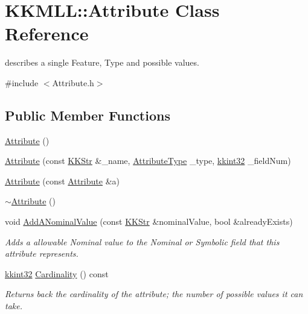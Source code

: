 \hypertarget{class_k_k_m_l_l_1_1_attribute}{}\section{K\+K\+M\+LL\+:\+:Attribute Class Reference}
\label{class_k_k_m_l_l_1_1_attribute}


describes a single Feature, Type and possible values.  




{\ttfamily \#include $<$Attribute.\+h$>$}

\subsection*{Public Member Functions}
\begin{DoxyCompactItemize}
\item 
\hyperlink{class_k_k_m_l_l_1_1_attribute_a8ba4e5a507aef352563e1e56f1930e66}{Attribute} ()
\item 
\hyperlink{class_k_k_m_l_l_1_1_attribute_ac654cf818459fb8a4c92a6232ff23c90}{Attribute} (const \hyperlink{class_k_k_b_1_1_k_k_str}{K\+K\+Str} \&\+\_\+name, \hyperlink{namespace_k_k_m_l_l_a99973706982b59debba670e2480555ab}{Attribute\+Type} \+\_\+type, \hyperlink{namespace_k_k_b_a8fa4952cc84fda1de4bec1fbdd8d5b1b}{kkint32} \+\_\+field\+Num)
\item 
\hyperlink{class_k_k_m_l_l_1_1_attribute_aca912ec438af7f63c2ac1f5c37dafbaa}{Attribute} (const \hyperlink{class_k_k_m_l_l_1_1_attribute}{Attribute} \&a)
\item 
\hyperlink{class_k_k_m_l_l_1_1_attribute_a28ab087bb886728670e4ae5791bc2ea8}{$\sim$\+Attribute} ()
\item 
void \hyperlink{class_k_k_m_l_l_1_1_attribute_aca915581709a40bd7021a482d566fa48}{Add\+A\+Nominal\+Value} (const \hyperlink{class_k_k_b_1_1_k_k_str}{K\+K\+Str} \&nominal\+Value, bool \&already\+Exists)
\begin{DoxyCompactList}\small\item\em Adds a allowable Nominal value to the Nominal or Symbolic field that this attribute represents. \end{DoxyCompactList}\item 
\hyperlink{namespace_k_k_b_a8fa4952cc84fda1de4bec1fbdd8d5b1b}{kkint32} \hyperlink{class_k_k_m_l_l_1_1_attribute_a7a7e8d04e3a93b47f6c2d1f99f0e42c6}{Cardinality} () const 
\begin{DoxyCompactList}\small\item\em Returns back the cardinality of the attribute; the number of possible values it can take. \end{DoxyCompactList}\item 

\end{DoxyCompactItemize}
